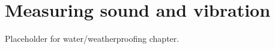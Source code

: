 \setchapterpreamble[u]{\margintoc}
\chapter{\color{gray} Measuring sound and vibration \color{black}}

Placeholder for water/weatherproofing chapter.
